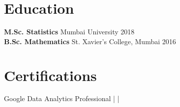 \documentclass[10pt,a4paper]{article}
\begin{document}
\section{Education}
\textbf{M.Sc. Statistics} \hfill Mumbai University \hfill 2018\\
\textbf{B.Sc. Mathematics} \hfill St. Xavier's College, Mumbai \hfill 2016

\section{Certifications}
{\ttfamily Google Data Analytics Professional} \quad| \quad|
\end{document}
